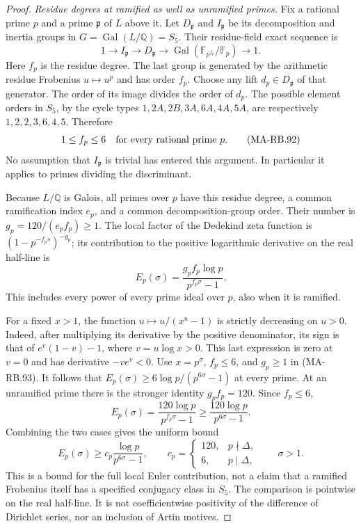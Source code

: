 \begin{proof}
\emph{Residue degrees at ramified as well as unramified primes.}
Fix a rational prime \(p\) and a prime \(\mathfrak p\)
of \(L\) above it. Let \(D_{\mathfrak p}\) and
\(I_{\mathfrak p}\) be its decomposition and inertia
groups in \(G=\operatorname{Gal}(L/\mathbb Q)=S_5\).
Their residue-field exact sequence is
\[
 1\longrightarrow I_{\mathfrak p}
  \longrightarrow D_{\mathfrak p}
  \longrightarrow
       \operatorname{Gal}(\mathbb F_{p^{f_p}}/\mathbb F_p)
  \longrightarrow1 .
 \tag{MA-RB.91}
\]
Here \(f_p\) is the residue degree. The last group
is generated by the arithmetic residue Frobenius
\(u\mapsto u^p\) and has order \(f_p\). Choose any
lift \(d_p\in D_{\mathfrak p}\) of that generator.
The order of its image divides the order of \(d_p\).
The possible element orders in \(S_5\), by the cycle
types \(1,2A,2B,3A,6A,4A,5A\), are respectively
\(1,2,2,3,6,4,5\). Therefore
\[
                     1\le f_p\le6
                         \quad\hbox{for every rational prime }p.
 \tag{MA-RB.92}
\]
No assumption that \(I_{\mathfrak p}\) is trivial
has entered this argument. In particular it applies
to primes dividing the discriminant.

Because \(L/\mathbb Q\) is Galois, all primes over
\(p\) have this residue degree, a common ramification
index \(e_p\), and a common decomposition-group order.
Their number is \(g_p=120/(e_pf_p)\ge1\).
The local factor of the Dedekind zeta function is
\((1-p^{-f_ps})^{-g_p}\); its contribution to the
positive logarithmic derivative on the real
half-line is
\[
 E_p(\sigma)
     =\frac{g_pf_p\log p}{p^{f_p\sigma}-1}.
 \tag{MA-RB.93}
\]
This includes every power of every prime ideal
over \(p\), also when it is ramified.

For a fixed \(x>1\), the function
\(u\mapsto u/(x^u-1)\) is strictly decreasing on
\(u>0\). Indeed, after multiplying its derivative
by the positive denominator, its sign is that of
\(e^v(1-v)-1\), where \(v=u\log x>0\).
This last expression is zero at \(v=0\) and has
derivative \(-ve^v<0\).
Use \(x=p^\sigma\), \(f_p\le6\), and \(g_p\ge1\)
in (MA-RB.93). It follows that
\(E_p(\sigma)\ge6\log p/(p^{6\sigma}-1)\) at every
prime. At an unramified prime there is the stronger
identity \(g_pf_p=120\). Since \(f_p\le6\),
\[
 E_p(\sigma)=\frac{120\log p}{p^{f_p\sigma}-1}
                  \ge\frac{120\log p}{p^{6\sigma}-1}.
\]
Combining the two cases gives the uniform bound
\[
 E_p(\sigma)\ge c_p\frac{\log p}{p^{6\sigma}-1},
 \qquad
 c_p=
 \begin{cases}
 120,&p\nmid\Delta,\\
 6,&p\mid\Delta,
 \end{cases}
 \qquad \sigma>1.
 \tag{MA-RB.94}
\]
This is a bound for the full local Euler contribution,
not a claim that a ramified Frobenius itself has a
specified conjugacy class in \(S_5\). The comparison
is pointwise on the real half-line. It is not
coefficientwise positivity of the difference of
Dirichlet series, nor an inclusion of Artin motives.


\end{proof}
